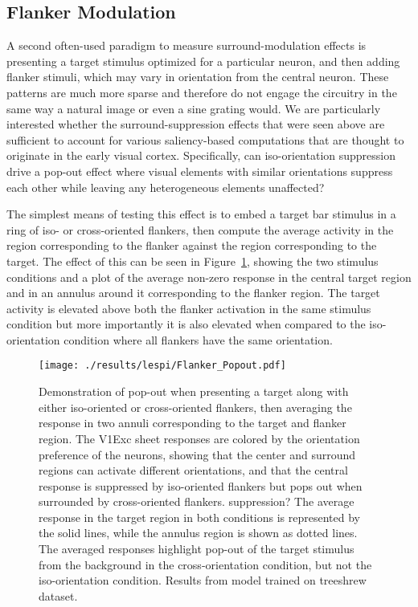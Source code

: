 \subsection{Flanker Modulation}

A second often-used paradigm to measure surround-modulation effects is
presenting a target stimulus optimized for a particular neuron, and
then adding flanker stimuli, which may vary in orientation from the
central neuron. These patterns are much more sparse and therefore do
not engage the circuitry in the same way a natural image or
even a sine grating would. We are particularly interested
whether the surround-suppression effects that were seen above are
sufficient to account for various saliency-based computations that are
thought to originate in the early visual cortex. Specifically, can
iso-orientation suppression drive a pop-out effect where visual
elements with similar orientations suppress each other while
leaving any heterogeneous elements unaffected?

The simplest means of testing this effect is to embed a target bar
stimulus in a ring of iso- or cross-oriented flankers, then compute
the average activity in the region corresponding to the flanker
against the region corresponding to the target. The
effect of this can be seen in Figure~\ref{Flanker_PopOut}, showing the
two stimulus conditions and a plot of the average non-zero response in
the central target region and in an annulus around it corresponding to
the flanker region. The target activity is elevated above both the
flanker activation in the same stimulus condition but more importantly
it is also elevated when compared to the iso-orientation condition
where all flankers have the same orientation.

\begin{figure}
	\centering
        \texttt{[image: ./results/lespi/Flanker\_Popout.pdf]}
	\caption[Pop-out effect in simple flanker paradigm.]{Demonstration
      of pop-out when presenting a target along with either
      iso-oriented or cross-oriented flankers, then averaging the
      response in two annuli corresponding to the target and flanker
      region. The V1Exc sheet responses are colored by the
      orientation preference of the neurons, showing that the center
      and surround regions can activate different orientations, and
      that the central response is suppressed by iso-oriented flankers
      but pops out when surrounded by cross-oriented flankers.
      suppression?  The average response in the target region in both
      conditions is represented by the solid lines, while the annulus
      region is shown as dotted lines. The averaged responses
      highlight pop-out of the target stimulus from the background in
      the cross-orientation condition, but not the iso-orientation
      condition. Results from model trained on treeshrew dataset.}
	\label{Flanker_PopOut}
\end{figure}

